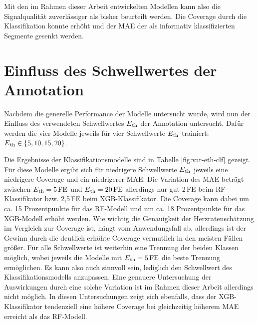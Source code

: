  Mit den im Rahmen dieser Arbeit entwickelten Modellen kann also die Signalqualität zuverlässiger als bisher beurteilt werden. Die Coverage durch die Klassifikation konnte erhöht und der \ac{MAE} der als informativ klassifizierten Segmente gesenkt werden.

\section{Einfluss des Schwellwertes der Annotation}

Nachdem die generelle Performance der Modelle untersucht wurde, wird nun der Einfluss des verwendeten Schwellwertes $E\textsubscript{th}$ der Annotation untersucht. Dafür werden die vier Modelle jeweils für vier Schwellwerte $E\textsubscript{th}$ trainiert: $E\textsubscript{th} \in \{5, 10, 15, 20\}$.

Die Ergebnisse der Klassifikationsmodelle sind in Tabelle \ref{fig:var-eth-clf} gezeigt. Für diese Modelle ergibt sich für niedrigere Schwellwerte $E\textsubscript{th}$ jeweils eine niedrigere Coverage und ein niedrigerer \ac{MAE}. Die Variation des \ac{MAE} beträgt zwischen $E\textsubscript{th}= 5\,\si{FE}$ und $E\textsubscript{th} = 20\,\si{FE}$ allerdings nur gut 2\,\si{FE} beim \ac{RF}-Klassifikator bzw. 2,5\,\si{FE} beim \ac{XGB}-Klassifikator. Die Coverage kann dabei um ca. 15 Prozentpunkte für das \ac{RF}-Modell und um ca. 18 Prozentpunkte für das \ac{XGB}-Modell erhöht werden. Wie wichtig die Genauigkeit der Herzratenschätzung im Vergleich zur Coverage ist, hängt vom Anwendungsfall ab, allerdings ist der Gewinn durch die deutlich erhöhte Coverage vermutlich in den meisten Fällen größer. Für alle Schwellwerte ist weiterhin eine Trennung der beiden Klassen möglich, wobei jeweils die Modelle mit $E\textsubscript{th}= 5\text{\,}\si{FE}$ die beste Trennung ermöglichen. Es kann also auch sinnvoll sein, lediglich den Schwellwert des Klassifikationsmodells anzupassen. Eine genauere Untersuchung der Auswirkungen durch eine solche Variation ist im Rahmen dieser Arbeit allerdings nicht möglich. In diesen Untersuchungen zeigt sich ebenfalls, dass der \ac{XGB}-Klassifikator tendenziell eine höhere Coverage bei gleichzeitig höherem \ac{MAE} erreicht als das \ac{RF}-Modell.

